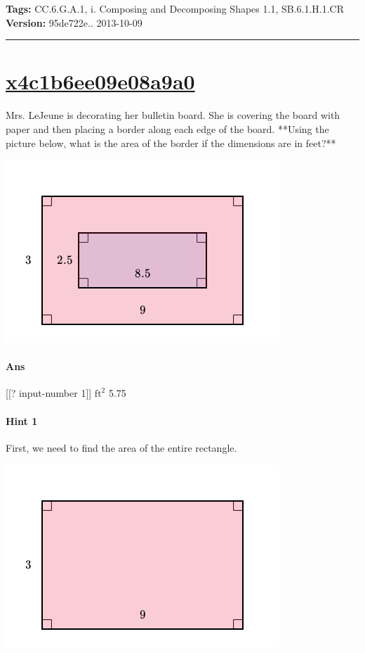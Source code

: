 \documentclass[twocolumn,10pt]{article}
\def\shrinkfactor{0.55}
\begin{document}
\medskip
\noindent
\textbf{Tags:} {\footnotesize CC.6.G.A.1, i.	Composing and Decomposing Shapes 1.1, SB.6.1.H.1.CR}\\
\textbf{Version:} 95de722e.. 2013-10-09
\smallskip\hrule





\section{\href{https://www.khanacademy.org/devadmin/content/items/x4c1b6ee09e08a9a0}{x4c1b6ee09e08a9a0}}

\noindent
Mrs. LeJeune is decorating her bulletin board.  She is covering the board with paper and then placing a border along each edge of the board.  **Using the picture below, what is the area of the border if the dimensions are in feet?**  


\includegraphics[scale=\shrinkfactor]{figures/c7954a5c36472e222f1bd6e7e53e5059a4a1b23a.png}

\paragraph{Ans}  [[? input-number 1]] $\text{ft}^2$  5.75

\paragraph{Hint 1}First, we need to find the area of the entire rectangle.  


\includegraphics[scale=\shrinkfactor]{figures/64da7088e42aa9dca888583ead3d7b5ca4760ea9.png}    
 
\end{document}
